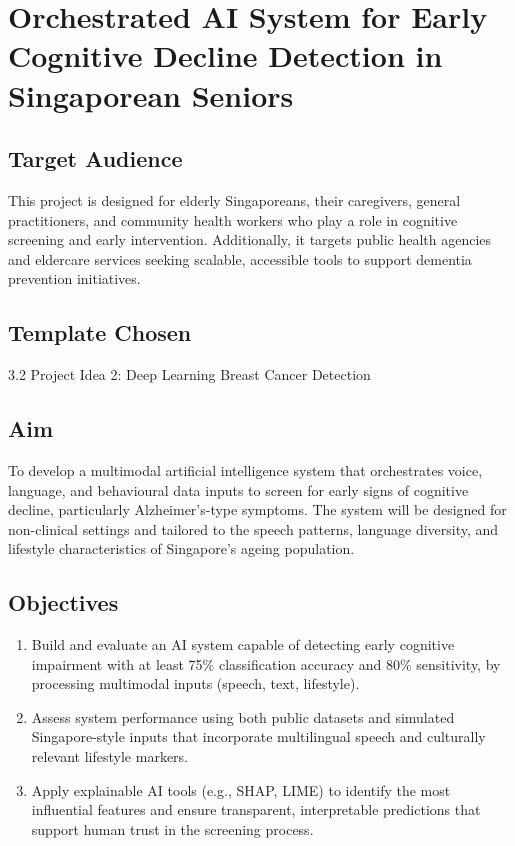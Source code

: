\documentclass[12pt]{article}
\begin{document}
\newpage


\section{Orchestrated AI System for Early Cognitive Decline Detection in Singaporean Seniors}

\subsection*{Target Audience}
This project is designed for elderly Singaporeans, their caregivers, general practitioners, and community health workers who play a role in cognitive screening and early intervention. Additionally, it targets public health agencies and eldercare services seeking scalable, accessible tools to support dementia prevention initiatives.

\subsection*{Template Chosen}
3.2 Project Idea 2: Deep Learning Breast Cancer Detection

\subsection*{Aim}
To develop a multimodal artificial intelligence system that orchestrates voice, language, and behavioural data inputs to screen for early signs of cognitive decline, particularly Alzheimer’s-type symptoms. The system will be designed for non-clinical settings and tailored to the speech patterns, language diversity, and lifestyle characteristics of Singapore's ageing population.

\subsection*{Objectives}
\begin{enumerate}[label=\arabic*.]
    \item Build and evaluate an AI system capable of detecting early cognitive impairment with at least 75\% classification accuracy and 80\% sensitivity, by processing multimodal inputs (speech, text, lifestyle).
    \item Assess system performance using both public datasets and simulated Singapore-style inputs that incorporate multilingual speech and culturally relevant lifestyle markers.
    \item Apply explainable AI tools (e.g., SHAP, LIME) to identify the most influential features and ensure transparent, interpretable predictions that support human trust in the screening process.
\end{enumerate}
\end{document}

